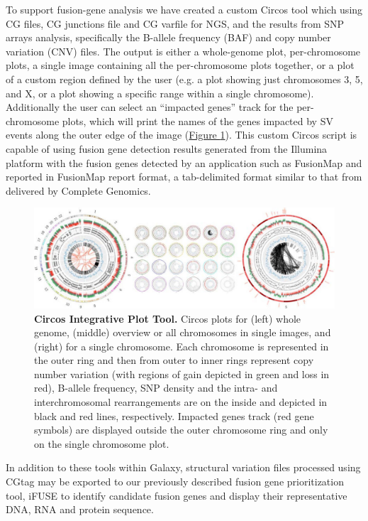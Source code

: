 To support fusion-gene analysis we have created a custom Circos tool which using CG files, CG junctions file and CG varfile for NGS, and the results from SNP arrays analysis, specifically the B-allele frequency (BAF) and copy number variation (CNV) files.  The output is either a whole-genome plot, per-chromosome plots, a single image containing all the per-chromosome plots together, or a plot of a custom region defined by the user (e.g. a plot showing just chromosomes 3, 5, and X, or a plot showing a specific range within a single chromosome).  Additionally the user can select an “impacted genes” track for the per-chromosome plots, which will print the names of the genes impacted by SV events along the outer edge of the image (\hyperref[fig:circos]{Figure \ref{fig:circos}}).  This custom Circos script is capable of using fusion gene detection results generated from the Illumina platform with the fusion genes detected by an application such as FusionMap \cite{fusionmap} and reported in FusionMap report format, a tab-delimited format similar to that from delivered by Complete Genomics.


\begin{figure}[t!]
\centering
\includegraphics[scale=2]{chapters/images/cgtag/fig2-circos.png}
\caption{\textbf{Circos Integrative Plot Tool.} Circos plots for (left) whole genome, (middle) overview or all chromosomes in single images, and (right) for a single chromosome.  Each chromosome is represented in the outer ring and then from outer to inner rings represent copy number variation (with regions of gain depicted in green and loss in red), B-allele frequency, SNP density and the intra- and interchromosomal rearrangements are on the inside and depicted in black and red lines, respectively.  Impacted genes track (red gene symbols) are displayed outside the outer chromosome ring and only on the single chromosome plot.}
\label{fig:circos}
\end{figure}


In addition to these tools within Galaxy, structural variation files processed using CGtag may be exported to our previously described fusion gene prioritization tool, iFUSE \cite{url-ifuse} to identify candidate fusion genes and display their representative DNA, RNA and protein sequence.



